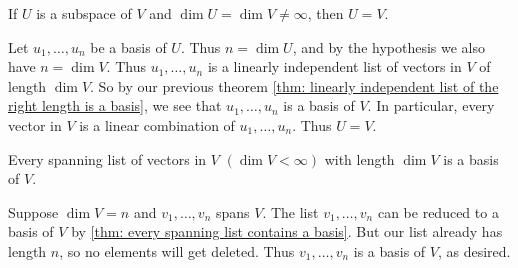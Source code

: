 \begin{thm} 
  \label{thm: subspace of full dimension equals the whole space}
  If $U$ is a subspace of $V$ and $\dim U = \dim V \neq \infty$, then $U=V$.
\end{thm}
\begin{prf}
  Let $u_1, \ldots, u_n$ be a basis of $U$. Thus $n = \dim U$, and by the hypothesis we also have $n = \dim V$. Thus $u_1, \ldots, u_n$ is a linearly independent list of vectors in $V$ of length $\dim V$. So by our previous theorem \ref{thm: linearly independent list of the right length is a basis}, we see that $u_1, \ldots, u_n$ is a basis of $V$. In particular, every vector in $V$ is a linear combination of $u_1, \ldots, u_n$. Thus $U=V$.
\end{prf}

\setcounter{thm}{41}
\begin{thm} 
  \label{thm: spanning list of the right length}
  Every spanning list of vectors in $V$ $(\dim V < \infty)$ with length $\dim V$ is a basis of $V$.
\end{thm}
\begin{prf}
  Suppose $\dim V = n$ and $v_1, \ldots, v_n$ spans $V$. The list $v_1, \ldots, v_n$ can be reduced to a basis of $V$ by \ref{thm: every spanning list contains a basis}. But our list already has length $n$, so no elements will get deleted. Thus $v_1, \ldots, v_n$ is a basis of $V$, as desired.
\end{prf}

